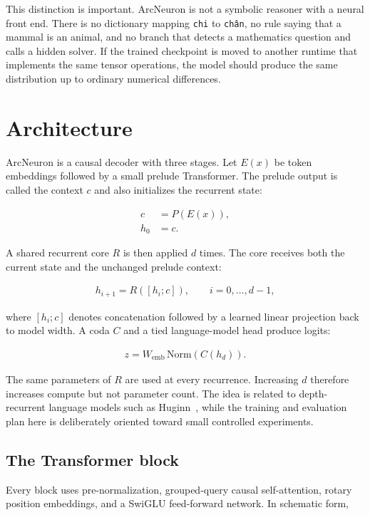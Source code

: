 \documentclass[10pt]{article}
\begin{document}
This distinction is important. ArcNeuron is not a symbolic reasoner with a neural front end. There is no dictionary mapping \texttt{chi} to \texttt{chân}, no rule saying that a mammal is an animal, and no branch that detects a mathematics question and calls a hidden solver. If the trained checkpoint is moved to another runtime that implements the same tensor operations, the model should produce the same distribution up to ordinary numerical differences.

\section{Architecture}

ArcNeuron is a causal decoder with three stages. Let $E(x)$ be token embeddings followed by a small prelude Transformer. The prelude output is called the context $c$ and also initializes the recurrent state:

\begin{align}
    c &= P(E(x)), \\
    h_0 &= c.
\end{align}

A shared recurrent core $R$ is then applied $d$ times. The core receives both the current state and the unchanged prelude context:

\begin{align}
    h_{i+1} = R([h_i;c]), \qquad i=0,\ldots,d-1,
\end{align}

where $[h_i;c]$ denotes concatenation followed by a learned linear projection back to model width. A coda $C$ and a tied language-model head produce logits:

\begin{align}
    z = W_{\mathrm{emb}}\,\mathrm{Norm}(C(h_d)).
\end{align}

The same parameters of $R$ are used at every recurrence. Increasing $d$ therefore increases compute but not parameter count. The idea is related to depth-recurrent language models such as Huginn~\cite{geiping2025recurrent}, while the training and evaluation plan here is deliberately oriented toward small controlled experiments.

\subsection{The Transformer block}

Every block uses pre-normalization, grouped-query causal self-attention, rotary position embeddings, and a SwiGLU feed-forward network. In schematic form,
\end{document}
